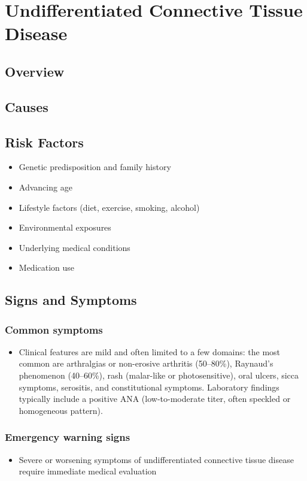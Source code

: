 \chapter{Undifferentiated Connective Tissue Disease}
\label{sec:Undifferentiated Connective Tissue Disease}

\section{Overview}

\section{Causes}
\section{Risk Factors}

\begin{itemize}[noitemsep]
  \item Genetic predisposition and family history
  \item Advancing age
  \item Lifestyle factors (diet, exercise, smoking, alcohol)
  \item Environmental exposures
  \item Underlying medical conditions
  \item Medication use
\end{itemize}
\section{Signs and Symptoms}

\subsection{Common symptoms}
\begin{itemize}[noitemsep]
  \item Clinical features are mild and often limited to a few domains: the most common are arthralgias or non-erosive arthritis (50--80\%), Raynaud's phenomenon (40--60\%), rash (malar-like or photosensitive), oral ulcers, sicca symptoms, serositis, and constitutional symptoms. Laboratory findings typically include a positive ANA (low-to-moderate titer, often speckled or homogeneous pattern). 
  \end{itemize}

\subsection{Emergency warning signs}
\begin{itemize}[noitemsep]
  \item Severe or worsening symptoms of undifferentiated connective tissue disease require immediate medical evaluation
\end{itemize}
